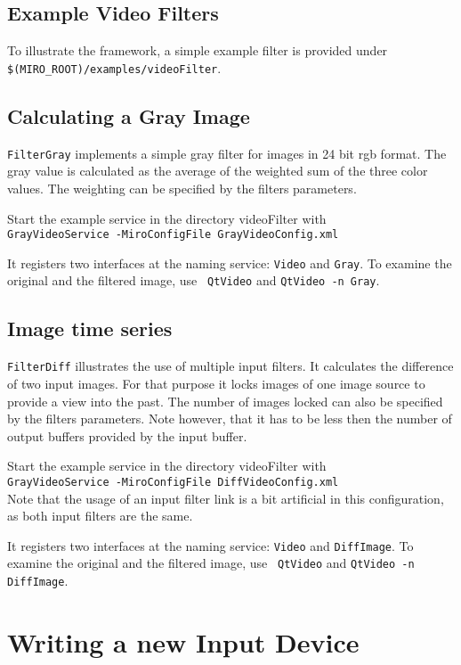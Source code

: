\subsection{Example Video Filters}

To illustrate the framework, a simple example filter is provided under
{\tt \$(MIRO\_ROOT)/examples/videoFilter}.

\subsection{Calculating a Gray Image}

{\tt FilterGray} implements a simple gray
filter for images in 24 bit rgb format. The gray value is calculated
as the average of the weighted sum of the three color values. The
weighting can be specified by the filters parameters.

Start the example service in the directory videoFilter with \\
{\tt GrayVideoService -MiroConfigFile GrayVideoConfig.xml}

It registers two interfaces at the naming service: {\tt Video} and
{\tt Gray}. To examine the original and the filtered image, use {\tt
  QtVideo} and {\tt QtVideo -n Gray}.

\subsection{Image time series}

{\tt FilterDiff} illustrates the use of multiple input filters. It
calculates the difference of two input images. For that purpose it
locks images of one image source to provide a view into the past. The
number of images locked can also be specified by the filters
parameters. Note however, that it has to be less then the number of
output buffers provided by the input buffer.

Start the example service in the directory videoFilter with \\
{\tt GrayVideoService -MiroConfigFile DiffVideoConfig.xml} \\
Note that the usage of an input filter link is a bit artificial in
this configuration, as both input filters are the same.

It registers two interfaces at the naming service: {\tt Video} and
{\tt DiffImage}. To examine the original and the filtered image, use {\tt
  QtVideo} and {\tt QtVideo -n DiffImage}.

\section{Writing a new Input Device}


